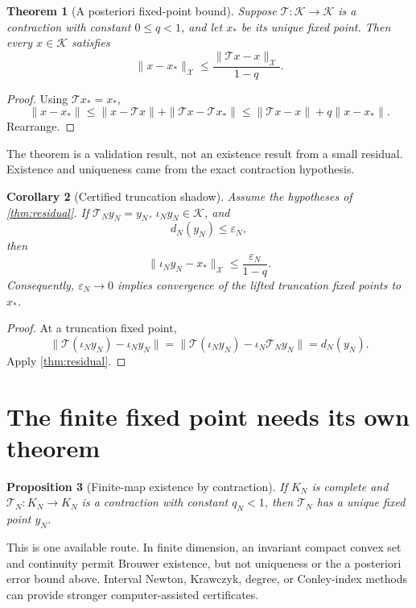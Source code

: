 \documentclass[11pt]{article}
\newtheorem{theorem}{Theorem}[section]
\newtheorem{proposition}[theorem]{Proposition}
\newtheorem{corollary}[theorem]{Corollary}
\theoremstyle{definition}
\theoremstyle{remark}
\newcommand{\X}{\mathcal X}
\newcommand{\Kset}{\mathcal K}
\newcommand{\Tmap}{\mathcal T}
\newcommand{\TN}{\mathcal T_N}
\newcommand{\iotaN}{\iota_N}
\begin{document}
\begin{theorem}[A posteriori fixed-point bound]
\label{thm:residual}
Suppose \(\Tmap:\Kset\to\Kset\) is a contraction with constant
\(0\leq q<1\), and let \(x_\ast\) be its unique fixed point. Then every
\(x\in\Kset\) satisfies
\[
 \|x-x_\ast\|_{\X}
 \leq
 \frac{\|\Tmap x-x\|_{\X}}{1-q}.
\]
\end{theorem}

\begin{proof}
Using \(\Tmap x_\ast=x_\ast\),
\[
 \|x-x_\ast\|
 \leq\|x-\Tmap x\|+\|\Tmap x-\Tmap x_\ast\|
 \leq\|\Tmap x-x\|+q\|x-x_\ast\|.
\]
Rearrange.
\end{proof}

The theorem is a validation result, not an existence result from a small
residual. Existence and uniqueness came from the exact contraction
hypothesis.

\begin{corollary}[Certified truncation shadow]
\label{cor:shadow}
Assume the hypotheses of \autoref{thm:residual}. If
\(\TN y_N=y_N\), \(\iotaN y_N\in\Kset\), and
\[
 d_N(y_N)\leq\varepsilon_N,
\]
then
\[
 \|\iotaN y_N-x_\ast\|_{\X}
 \leq\frac{\varepsilon_N}{1-q}.
\]
Consequently, \(\varepsilon_N\to0\) implies convergence of the lifted
truncation fixed points to \(x_\ast\).
\end{corollary}

\begin{proof}
At a truncation fixed point,
\[
 \|\Tmap(\iotaN y_N)-\iotaN y_N\|
 =
 \|\Tmap(\iotaN y_N)-\iotaN\TN y_N\|
 =d_N(y_N).
\]
Apply \autoref{thm:residual}.
\end{proof}

\section{The finite fixed point needs its own theorem}

\begin{proposition}[Finite-map existence by contraction]
\label{prop:finite-existence}
If \(K_N\) is complete and
\(\TN:K_N\to K_N\) is a contraction with constant \(q_N<1\), then
\(\TN\) has a unique fixed point \(y_N\).
\end{proposition}

This is one available route. In finite dimension, an invariant compact
convex set and continuity permit Brouwer existence, but not uniqueness or
the a posteriori error bound above. Interval Newton, Krawczyk, degree, or
Conley-index methods can provide stronger computer-assisted certificates.
\end{document}

